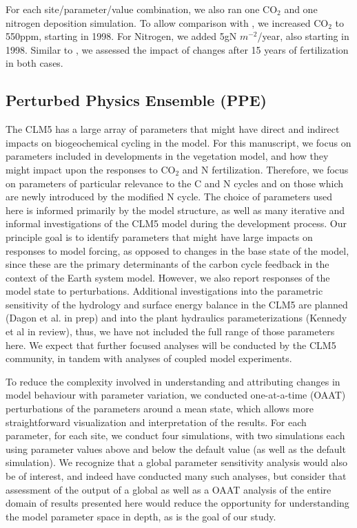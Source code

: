 \documentclass[draft,linenumbers]{agujournal}
\begin{document}
For each site/parameter/value combination, we also ran one CO$_{2}$ and one nitrogen deposition simulation. To allow comparison with \cite{wieder}, we increased CO$_{2}$ to 550ppm, starting in 1998. For Nitrogen, we added 5gN $m^{-2}$/year, also starting in 1998. Similar to \cite{wieder}, we assessed the impact of changes after 15 years of fertilization in both cases.

\subsection{Perturbed Physics Ensemble (PPE)}
The CLM5 has a large array of parameters that might have direct and indirect impacts on biogeochemical cycling in the model. For this manuscript, we focus on parameters included in developments in the vegetation model, and how they might impact upon the responses to CO$_{2}$ and N fertilization. Therefore, we focus on parameters of particular relevance to the C and N cycles and on those which are newly introduced by the modified N cycle. The choice of parameters used here is informed primarily by the model structure, as well as many iterative and informal investigations of the CLM5 model during the development process. 
Our principle goal is to identify parameters that might have large impacts on responses to model forcing, as opposed to changes in the base state of the model, since these are the primary determinants of the carbon cycle feedback in the context of the Earth system model. However, we also report responses of the model state to perturbations. Additional investigations into the parametric sensitivity of the hydrology and surface energy balance in the CLM5 are planned (Dagon et al. in prep) and into the plant hydraulics parameterizations (Kennedy et al in review), thus, we have not included the full range of those parameters here. We expect that further focused analyses will be conducted by the CLM5 community, in tandem with analyses of coupled model experiments. 

To reduce the complexity involved in understanding and attributing changes in model behaviour with parameter variation, we conducted one-at-a-time (OAAT) perturbations of the parameters around a mean state, which allows more straightforward visualization and interpretation of the results. For each parameter, for each site, we conduct four simulations, with two simulations each using parameter values above and  below the default value (as well as the default simulation). We recognize that a global parameter sensitivity analysis would also be of interest, and indeed have conducted many such analyses, but consider that assessment of the output of a global as well as a OAAT analysis of the entire domain of results presented here would reduce the opportunity for understanding the model parameter space in depth, as is the goal of our study. 
\end{document}
